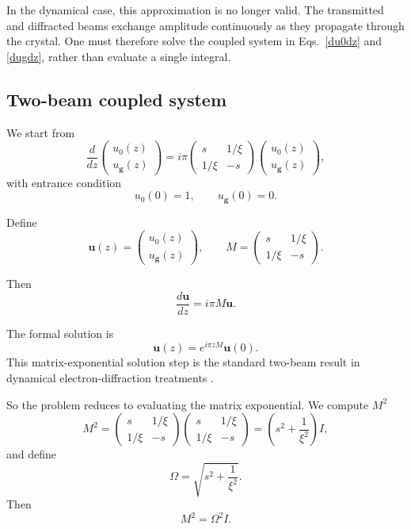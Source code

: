 \documentclass[11pt]{article}
\begin{document}
In the dynamical case, this approximation is no longer valid. The transmitted and diffracted beams exchange amplitude continuously as they propagate through the crystal. One must therefore solve the coupled system in Eqs.~\eqref{du0dz} and \eqref{dugdz}, rather than evaluate a single integral.

\subsection{Two-beam coupled system}

We start from
\[
\frac{d}{dz}
\begin{pmatrix}
u_0(z)\\
u_{\mathbf g}(z)
\end{pmatrix}
=
i\pi
\begin{pmatrix}
s & 1/\xi\\
1/\xi & -s
\end{pmatrix}
\begin{pmatrix}
u_0(z)\\
u_{\mathbf g}(z)
\end{pmatrix},
\]
with entrance condition
\[
u_0(0)=1,
\qquad
u_{\mathbf g}(0)=0.
\]

Define
\[
\mathbf{u}(z)=
\begin{pmatrix}
u_0(z)\\
u_{\mathbf g}(z)
\end{pmatrix},
\qquad
M=
\begin{pmatrix}
s & 1/\xi\\
1/\xi & -s
\end{pmatrix}.
\]

Then
\[
\frac{d\mathbf{u}}{dz}=i\pi M\mathbf{u}.
\]

The formal solution is
\[
\mathbf{u}(z)=e^{i\pi zM}\mathbf{u}(0).
\]
This matrix-exponential solution step is the standard two-beam result in dynamical electron-diffraction treatments \cite{MoodieCowleyGoodman_DynamicalED}.

So the problem reduces to evaluating the matrix exponential. We compute $M^2$
\[
M^2=
\begin{pmatrix}
s & 1/\xi\\
1/\xi & -s
\end{pmatrix}
\begin{pmatrix}
s & 1/\xi\\
1/\xi & -s
\end{pmatrix}
=
\left(s^2+\frac{1}{\xi^2}\right)I,
\]
and define
\[
\Omega=\sqrt{s^2+\frac{1}{\xi^2}}.
\]
Then
\[
M^2=\Omega^2 I.
\]
\end{document}
